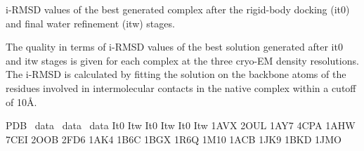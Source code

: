 \caption{i-RMSD values of the best generated complex after the rigid-body docking (it0) and final water refinement (itw) stages.}
{The quality in terms of i-RMSD values of the best solution generated after it0 and itw stages is given for each complex at the three cryo-EM density resolutions.
The i-RMSD is calculated by fitting the solution on the backbone atoms of the residues involved in intermolecular contacts in the native complex within a cutoff of 10Å. 
}
\stopbuffer


\bTABLE
\setupTABLE[align=middle, width=broad]
\bTABLEhead
\bTR \bTD[nr=2] PDB \eTD  {}\Angstrom\ data  \eTD       
{}\Angstrom\ data  \eTD         {}\Angstrom\ data \eTD \eTR \bTR
\bTD It0  \eTD \bTD   Itw  \eTD \bTD   It0  \eTD \bTD   Itw  \eTD \bTD   It0
\eTD \bTD   Itw   \eTD \eTR
\eTABLEhead
\bTABLEbody
\bTR \bTD 1AVX \eTD {} \eTD {} \eTD {} \eTD {} \eTD {}  \eTD {} \eTD \eTR 
\bTR \bTD 2OUL \eTD {} \eTD {} \eTD {} \eTD {} \eTD {}  \eTD {} \eTD \eTR
\bTR \bTD 1AY7 \eTD {} \eTD {} \eTD {} \eTD {} \eTD {}  \eTD {} \eTD \eTR
\bTR \bTD 4CPA \eTD {} \eTD {} \eTD {} \eTD {} \eTD {}  \eTD {} \eTD \eTR
\bTR \bTD 1AHW \eTD {} \eTD {} \eTD {} \eTD {} \eTD {}  \eTD {} \eTD \eTR
\bTR \bTD 7CEI \eTD {} \eTD {} \eTD {} \eTD {} \eTD {}  \eTD {} \eTD \eTR
\bTR \bTD 2OOB \eTD {} \eTD {} \eTD {} \eTD {} \eTD {}  \eTD {} \eTD \eTR
\bTR \bTD 2FD6 \eTD {} \eTD {} \eTD {} \eTD {} \eTD {}  \eTD {} \eTD \eTR
\bTR \bTD 1AK4 \eTD {} \eTD {} \eTD {} \eTD {} \eTD {}  \eTD {} \eTD \eTR
\bTR \bTD 1B6C \eTD {} \eTD {} \eTD {} \eTD {} \eTD {}  \eTD {} \eTD \eTR
\bTR \bTD 1BGX \eTD {} \eTD {} \eTD {} \eTD {} \eTD {}  \eTD {} \eTD \eTR
\bTR \bTD 1R6Q \eTD {} \eTD {} \eTD {} \eTD {} \eTD {}  \eTD {} \eTD \eTR
\bTR \bTD 1M10 \eTD {} \eTD {} \eTD {} \eTD {} \eTD {}  \eTD {} \eTD \eTR
\bTR \bTD 1ACB \eTD {} \eTD {} \eTD {} \eTD {} \eTD {}  \eTD {} \eTD \eTR
\bTR \bTD 1JK9 \eTD {} \eTD {} \eTD {} \eTD {} \eTD {}  \eTD {} \eTD \eTR
\bTR \bTD 1BKD \eTD {} \eTD {} \eTD {} \eTD {} \eTD {}  \eTD {} \eTD \eTR
\bTR \bTD 1JMO \eTD {} \eTD {} \eTD {} \eTD {} \eTD {}  \eTD {} \eTD \eTR
\eTABLEbody
\eTABLE
\stopbuffer
